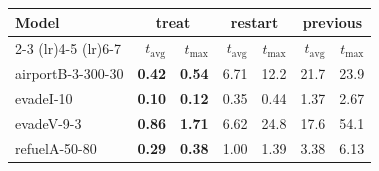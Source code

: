 \begin{tabular}{lrrrrrr}
\toprule
\multirow{2}{*}{Model} & \multicolumn{2}{c}{treat} & \multicolumn{2}{c}{restart} & \multicolumn{2}{c}{previous} \\
    \cmidrule(lr){2-3} \cmidrule(lr){4-5} \cmidrule(lr){6-7}
 & $t_\text{avg}$ & $t_\text{max}$ & $t_\text{avg}$ & $t_\text{max}$ & $t_\text{avg}$ & $t_\text{max}$ \\
\midrule
airportB-3-300-30 & \textbf{0.42} & \textbf{0.54} & 6.71 & 12.2 & 21.7 & 23.9 \\
evadeI-10 & \textbf{0.10} & \textbf{0.12} & 0.35 & 0.44 & 1.37 & 2.67 \\
evadeV-9-3 & \textbf{0.86} & \textbf{1.71} & 6.62 & 24.8 & 17.6 & 54.1 \\
refuelA-50-80 & \textbf{0.29} & \textbf{0.38} & 1.00 & 1.39 & 3.38 & 6.13 \\
\bottomrule
\end{tabular}
